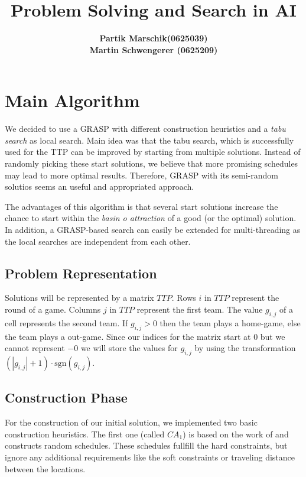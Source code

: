\documentclass[a4paper,11pt]{article}
\title{ \LARGE \bf Problem Solving and Search in AI }
\author{
\bf Partik Marschik(0625039) \\
\bf Martin Schwengerer (0625209) }
\begin{document}
\maketitle

\section{Main Algorithm}
We decided to use a \ac{GRASP} with different construction heuristics and a \emph{tabu search} as local search.
Main idea was that the tabu search, which is successfully used for the TTP\cite{Gaspero07} can be improved by starting from multiple solutions. Instead of randomly
picking these start solutions, we believe that more promising schedules may lead to more optimal results. Therefore, \ac{GRASP} with its semi-random solutios seems an 
useful and appropriated approach.

The advantages of this algorithm is that several start solutions increase the chance to start within the \emph{basin o attraction} of a good (or the optimal) solution.
In addition, a \ac{GRASP}-based search can easily be extended for multi-threading as the local searches are independent from each other.

\subsection{Problem Representation}
Solutions will be represented by a matrix $TTP$.
Rows $i$ in $TTP$ represent the round of a game.
Columns $j$ in $TTP$ represent the first team.
The value $g_{i,j}$ of a cell represents the second team.
If $g_{i,j} > 0$ then the team plays a home-game, else the team plays a out-game.
Since our indices for the matrix start at $0$ but we cannot represent $-0$ we will
store the values for $g_{i,j}$ by using the transformation
$(|g_{i,j}| + 1) \cdot \text{sgn}(g_{i,j})$.

\subsection{Construction Phase}
For the construction of our initial solution, we implemented two basic construction heuristics.
The first one (called $CA_1$) is based on the work of  \cite{Anagnostopoulos06} and constructs random schedules. These schedules fullfill the hard constraints, but ignore any additional 
requirements like the soft constraints or traveling distance between the locations.
\end{document}
